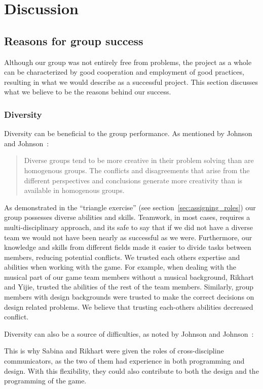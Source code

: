 \chapter{Discussion} \label{chap:discussion}
\section{Reasons for group success}
Although our group was not entirely free from problems, the project as a whole can be characterized by good cooperation and employment of good practices, resulting in what we would describe as a successful project. This section discusses what we believe to be the reasons behind our success.
\subsection{Diversity}
Diversity can be beneficial to the group performance. As mentioned by Johnson and Johnson~\cite[p. 445]{2013johnson}:
\begin{quote}
Diverse groups tend to be more creative in their problem solving than are homogenous groups. The conflicts and disagreements that arise from the different perspectives and conclusions generate more creativity than is available in homogenous groups.
\end{quote}

As demonstrated in the “triangle exercise” (see section~\ref{sec:assigning_roles}) our group possesses diverse abilities and skills. Teamwork, in most cases, requires a multi-disciplinary approach, and its safe to say that if we did not have a diverse team we would not have been nearly as successful as we were. Furthermore, our knowledge and skills from different fields made it easier to divide tasks between members, reducing potential conflicts. We trusted each others expertise and abilities when working with the game. For example, when dealing with the musical part of our game team members without a musical background, Rikhart and Yijie, trusted the abilities of the rest of the team members. Similarly, group members with design backgrounds were trusted to make the correct decisions on design related problems. We believe that trusting each-others abilities decreased conflict.  

Diversity can also be a source of difficulties, as noted by Johnson and Johnson~\cite[p. 446]{2013johnson}:
\begin{quote}
\end{quote} 
This is why Sabina and Rikhart were given the roles of cross-discipline communicators, as the two of them had experience in both programming and design. With this flexibility, they could also contribute to both the design and the programming of the game.

